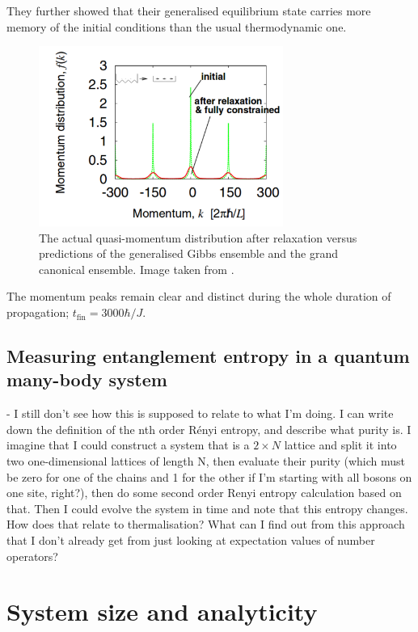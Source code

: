 \documentclass[a4paper, 10pt]{article}
\theoremstyle{plain}
\begin{document}
They further showed that their generalised equilibrium state carries more memory
of the initial conditions than the usual thermodynamic one.
\begin{figure}[H]
    \begin{center}
        \includegraphics[width=8cm]{after_relaxation_rigol}
    \end{center}
    \caption{The actual quasi-momentum distribution after relaxation versus
             predictions of the generalised Gibbs ensemble and the grand
             canonical ensemble. Image taken from \cite{Rigol2007}.}
\end{figure}
The momentum peaks remain clear and distinct during the whole duration  of
propagation; $t_{\text{fin}} = 3000 \hbar/J$.


\subsection{Measuring entanglement entropy in a quantum many-body system}

- I still don't see how this is supposed to relate to what I'm doing.
I can write down the definition of the nth order R{\'e}nyi entropy, and
describe what purity is. I imagine that I could construct a system that is a
$2 \times N$ lattice and split it into two one-dimensional lattices of length N,
then evaluate their purity (which must be zero for one of the chains and 1 for
the other if I'm starting with all bosons on one site, right?), then do some
second order Renyi entropy calculation based on that. Then I could evolve the
system in time and note that this entropy changes. How does that relate to
thermalisation? What can I find out from this approach that I don't already
get from just looking at expectation values of number operators?
\newpage


\section{System size and analyticity}
\end{document}
